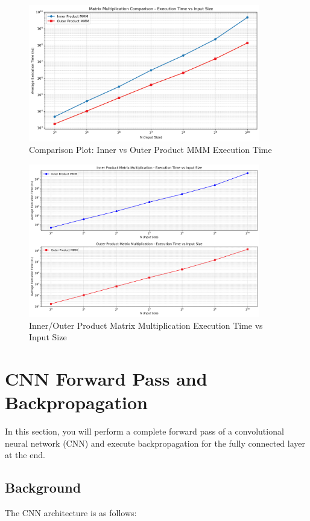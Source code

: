 \documentclass[a4 paper]{article}
\begin{document}
\begin{figure}[htbp!]
    \centering
    \includegraphics[width=0.9\textwidth]{matrix_multiplication_comparison.png}
    \caption{Comparison Plot: Inner vs Outer Product MMM Execution Time}
\end{figure}

\begin{figure}[htbp!]
    \centering
    \includegraphics[width=0.9\textwidth]{matrix_multiplication_subplots.png}
    \caption{Inner/Outer Product Matrix Multiplication Execution Time vs Input Size}
\end{figure}

\pagebreak
\newpage
\section{CNN Forward Pass and Backpropagation}
\label{sec:cnn}

In this section, you will perform a complete forward pass of a convolutional neural network (CNN) and execute backpropagation for the fully connected layer at the end.

\subsection*{Background}
The CNN architecture is as follows:
\end{document}
